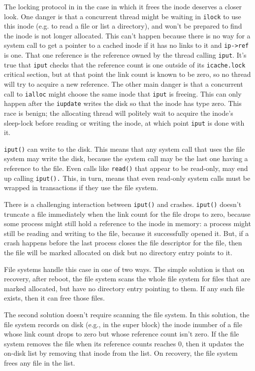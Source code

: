 The locking protocol in 
in the case in which it frees the inode deserves a closer look.
One danger is that a concurrent thread might be waiting in
\lstinline{ilock}
to use this inode (e.g. to read a file or list a directory),
and won't be prepared to find the inode is not longer
allocated. This can't happen because there is no way for
a system call to get a pointer to a cached inode if it has
no links to it and 
\lstinline{ip->ref}
is one. That one reference is the reference owned by the
thread calling
\lstinline{iput}.
It's true that 
\lstinline{iput}
checks that the reference count is one outside of its
\lstinline{icache.lock}
critical section, but at that point the link
count is known to be zero, so no thread will try
to acquire a new reference.
The other main danger is that a concurrent call to
\lstinline{ialloc}
might choose the same inode that
\lstinline{iput}
is freeing.
This can only happen after the
\lstinline{iupdate}
writes the disk so that the inode has type zero.
This race is benign; the allocating thread will politely wait
to acquire the inode's sleep-lock before reading or writing
the inode, at which point
\lstinline{iput}
is done with it.

\lstinline{iput()}
can write to the disk.  This means that any system call that uses the file
system may write the disk, because the system call may be the last one having a
reference to the file. Even calls like
\lstinline{read()}
that appear to be read-only, may end up calling
\lstinline{iput().}
This, in turn, means that even read-only system calls
must be wrapped in transactions if they use the file system.

There is a challenging interaction between
\lstinline{iput()}
and crashes.
\lstinline{iput()}
doesn't truncate a file immediately when the link count for the file
drops to zero, because some process might still hold a reference to the inode in
memory: a process might still be reading and writing to the file, because it
successfully opened it. But, if a crash happens before the last process closes
the file descriptor for the file, then the file will be marked allocated on disk
but no directory entry points to it.

File systems handle this case in one of two ways. The simple solution is that on
recovery, after reboot, the file system scans the whole file system for files
that are marked allocated, but have no directory entry pointing to them.  If any
such file exists, then it can free those files.

The second solution doesn't require scanning the file system.  In this solution,
the file system records on disk (e.g., in the super block) the inode inumber of
a file whose link count drops to zero but whose reference count isn't zero.  If
the file system removes the file when its reference counts reaches 0, then it
updates the on-disk list by removing that inode from the list. On recovery, the
file system frees any file in the list.

